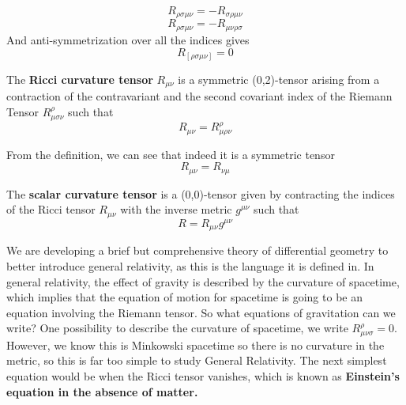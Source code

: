 \documentclass{article}
\begin{document}
\begin{enumerate}
\begin{thm}
\begin{equation}
 					\end{equation}
 					\begin{equation}
 						\label{eq:RiemannSymmetry2}
 						\boxed{R_{\rho\sigma\mu\nu} = -R_{\sigma\rho\mu\nu}}
 					\end{equation}
 					\begin{equation}
 						\label{eq:RiemannSymmetry3}
 						\boxed{R_{\rho\sigma\mu\nu} = -R_{\mu\nu\rho\sigma}}
 					\end{equation}
 					And anti-symmetrization over all the indices gives
 					\begin{equation}
 						\label{eq:RiemannAntiSymmetry}
 						\boxed{R_{\left[ \rho\sigma\mu\nu \right]} = 0}
 					\end{equation}
 				\end{thm}
 		\end{enumerate}
 		\begin{defn}
			The \textbf{Ricci curvature tensor} $R_{\mu\nu}$ is a symmetric (0,2)-tensor arising from a contraction of the contravariant and the second covariant index of the Riemann Tensor $R^{\rho}_{\mu\sigma\nu}$ such that
			\begin{equation}
				\label{eq:RicciTensor}
				\boxed{R_{\mu\nu} = R^{\rho}_{\mu\rho\nu}}
			\end{equation}
		\end{defn}
		From the definition, we can see that indeed it is a symmetric tensor
		\begin{equation}
			R_{\mu\nu} = R_{\nu\mu}
		\end{equation}
	 	\begin{defn}
	 		The \textbf{scalar curvature tensor} is a (0,0)-tensor given by contracting the indices of the Ricci tensor $R_{\mu\nu}$ with the inverse metric $g^{\mu\nu}$ such that
	 		\begin{equation}
	 			\label{eq:ScalarCurvature}
	 			\boxed{R = R_{\mu\nu} g^{\mu\nu} }
	 		\end{equation}
	 	\end{defn}
 		We are developing a brief but comprehensive theory of differential geometry to better introduce general relativity, as this is the language it is defined in. In general relativity, the effect of gravity is described by the curvature of spacetime, which implies that the equation of motion for spacetime is going to be an equation involving the Riemann tensor. So what equations of gravitation can we write? One possibility to describe the curvature of spacetime, we write $R^{\rho}_{\mu\nu\sigma} = 0$. However, we know this is Minkowski spacetime so there is no curvature in the metric, so this is far too simple to study General Relativity. The next simplest equation would be when the Ricci tensor vanishes, which is known as \textbf{Einstein's equation in the absence of matter.}
\end{document}
